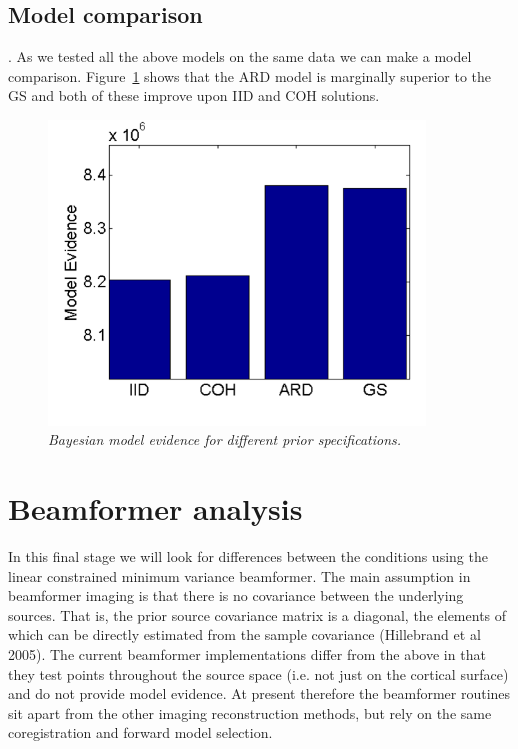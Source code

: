 \subsection{Model comparison}.
As we tested all the above models on the same data we can make a model comparison. Figure~\ref{meg_sloc:fig:9} shows that the ARD model is marginally superior to the GS and both of these improve upon IID and COH solutions.

\begin{figure}
\begin{center}
\includegraphics[width=100mm]{meg_sloc/slide9}
\caption{\em Bayesian model evidence for different prior specifications.\label{meg_sloc:fig:9}}
\end{center}
\end{figure}


\section{Beamformer analysis}
In this final stage we will look for differences between the conditions using the linear constrained minimum variance beamformer. The main assumption in beamformer imaging is that there is no covariance between the underlying sources. That is, the prior source covariance matrix is a diagonal, the elements of which can be directly estimated from the sample covariance (Hillebrand et al 2005).
The current beamformer implementations differ from the above in that they test points throughout the source space (i.e. not just on the cortical surface) and do not provide model evidence. At present therefore the beamformer routines sit apart from the other imaging reconstruction methods, but rely on the same coregistration and forward model selection.

